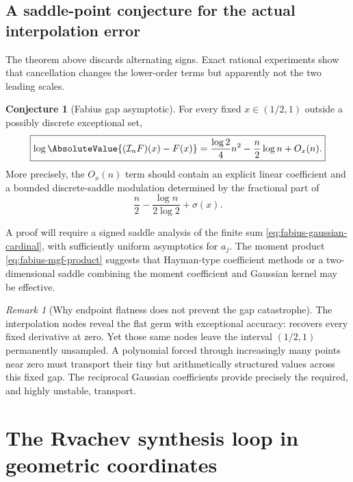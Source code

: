 \documentclass[11pt,oneside]{book}
\numberwithin{equation}{chapter}
\theoremstyle{definition}
\newtheorem{conjecture}[theorem]{Conjecture}
\theoremstyle{remark}
\newtheorem{remark}[theorem]{Remark}
\newcommand{\Interp}{\mathcal I}
\begin{document}
\section{A saddle-point conjecture for the actual interpolation error}

The theorem above discards alternating signs.  Exact rational experiments
show that cancellation changes the lower-order terms but apparently not the
two leading scales.

\begin{conjecture}[Fabius gap asymptotic]
\label{conj:fabius-gap-asymptotic}
For every fixed $x\in(1/2,1)$ outside a possibly discrete exceptional set,
\begin{equation}
 \boxed{
 \log\AbsoluteValue{(\Interp_nF)(x)-F(x)}
 =\frac{\log2}{4}n^2-\frac n2\log n+O_x(n).}
 \label{eq:conj-fabius-gap-asymptotic}
\end{equation}
More precisely, the $O_x(n)$ term should contain an explicit linear
coefficient and a bounded discrete-saddle modulation determined by the
fractional part of
\begin{equation}
 \frac n2-\frac{\log n}{2\log2}+\sigma(x).
 \label{eq:conj-fabius-saddle-phase}
\end{equation}
\end{conjecture}

A proof will require a signed saddle analysis of the finite sum
\eqref{eq:fabius-gaussian-cardinal}, with sufficiently uniform asymptotics
for $a_j$.  The moment product \eqref{eq:fabius-mgf-product} suggests that
Hayman-type coefficient methods or a two-dimensional saddle combining the
moment coefficient and Gaussian kernel may be effective.

\begin{remark}[Why endpoint flatness does not prevent the gap catastrophe]
The interpolation nodes reveal the flat germ with exceptional accuracy:
 recovers every fixed derivative at zero.  Yet
those same nodes leave the interval $(1/2,1)$ permanently unsampled.  A
polynomial forced through increasingly many points near zero must transport
their tiny but arithmetically structured values across this fixed gap.  The
reciprocal Gaussian coefficients provide precisely the required, and highly
unstable, transport.
\end{remark}

\chapter{The Rvachev synthesis loop in geometric coordinates}
\label{chap:rvachev-loop}
\end{document}
